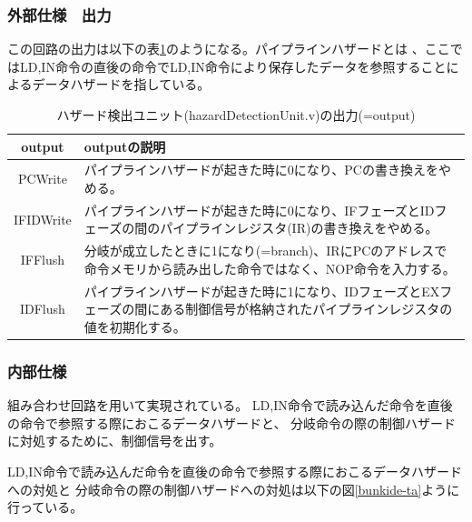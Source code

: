 \documentclass[a4j,titlepage]{jarticle}
\begin{document}
\subsubsection{外部仕様　出力}
この回路の出力は以下の表\ref{hazardDetectionUnitO}のようになる。パイプラインハザードとは
、ここではLD,IN命令の直後の命令でLD,IN命令により保存したデータを参照することによるデータハザードを指している。
\begin{table}[H]
    \caption{ハザード検出ユニット(hazardDetectionUnit.v)の出力(=output)}
    \label{hazardDetectionUnitO}
    \begin{center}
    \begin {tabularx}{150mm}{|c|X|} \hline
         output & outputの説明 \\ \hline \hline
         PCWrite & パイプラインハザードが起きた時に0になり、PCの書き換えをやめる。 \\ \hline
         IFIDWrite & パイプラインハザードが起きた時に0になり、IFフェーズとIDフェーズの間のパイプラインレジスタ(IR)の書き換えをやめる。 \\ \hline
         IFFlush & 分岐が成立したときに1になり(=branch)、IRにPCのアドレスで命令メモリから読み出した命令ではなく、NOP命令を入力する。\\ \hline
         IDFlush & パイプラインハザードが起きた時に1になり、IDフェーズとEXフェーズの間にある制御信号が格納されたパイプラインレジスタの値を初期化する。\\ \hline
    \end {tabularx}
    \end{center}
\end{table}

\subsubsection{内部仕様}
組み合わせ回路を用いて実現されている。
LD,IN命令で読み込んだ命令を直後の命令で参照する際におこるデータハザードと、
分岐命令の際の制御ハザードに対処するために、制御信号を出す。

LD,IN命令で読み込んだ命令を直後の命令で参照する際におこるデータハザードへの対処と
分岐命令の際の制御ハザードへの対処は以下の図\ref{bunkide-ta}ように行っている。
\end{document}

